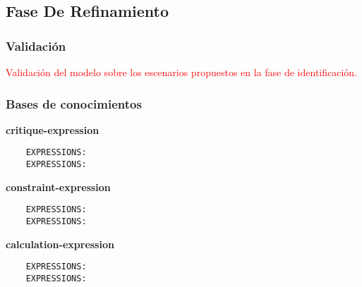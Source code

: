 \documentclass[12pt,a4paper,twoside,spanish]{article}      %
\begin{document}

\subsection{Fase De Refinamiento}


\subsubsection{Validación}

\textcolor {red} {Validación del modelo sobre los escenarios propuestos en la fase de identificación.}

\subsubsection{Bases de conocimientos}

\textbf {critique-expression}
\begin{lstlisting}
    EXPRESSIONS:
    EXPRESSIONS:
\end{lstlisting}

\textbf {constraint-expression}
\begin{lstlisting}
    EXPRESSIONS:
    EXPRESSIONS:
\end{lstlisting}

\textbf {calculation-expression}
\begin{lstlisting}
    EXPRESSIONS:
    EXPRESSIONS:
\end{lstlisting}
\end{document}
